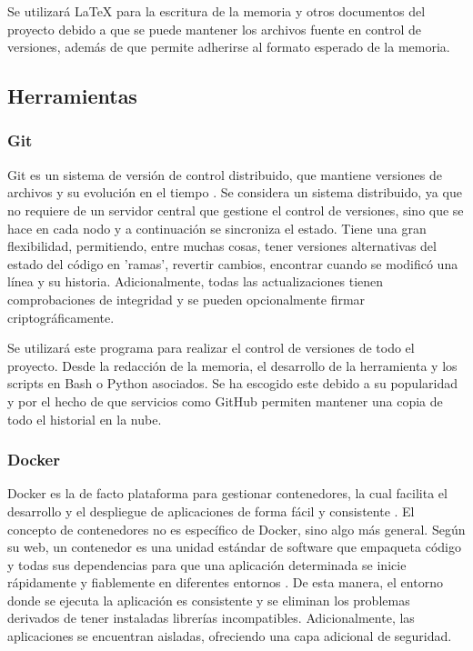Se utilizará LaTeX para la escritura de la memoria y otros documentos del proyecto debido a que se puede mantener los archivos fuente en control de versiones, además de que permite adherirse al formato esperado de la memoria.

\subsection{Herramientas}

\subsubsection{Git}

Git es un sistema de versión de control distribuido, que mantiene versiones de archivos y su evolución en el tiempo \cite{chacon2014pro}. Se considera un sistema distribuido, ya que no requiere de un servidor central que gestione el control de versiones, sino que se hace en cada nodo y a continuación se sincroniza el estado. Tiene una gran flexibilidad, permitiendo, entre muchas cosas, tener versiones alternativas del estado del código en 'ramas', revertir cambios, encontrar cuando se modificó una línea y su historia. Adicionalmente, todas las actualizaciones tienen comprobaciones de integridad y se pueden opcionalmente firmar criptográficamente.

Se utilizará este programa para realizar el control de versiones de todo el proyecto. Desde la redacción de la memoria, el desarrollo de la herramienta y los scripts en Bash o Python asociados. Se ha escogido este debido a su popularidad y por el hecho de que servicios como GitHub permiten mantener una copia de todo el historial en la nube.

\subsubsection{Docker}

Docker es la de facto plataforma para gestionar contenedores, la cual facilita el desarrollo y el despliegue de aplicaciones de forma fácil y consistente \cite{dockerruntime}. El concepto de contenedores no es específico de Docker, sino algo más general. Según su web, un contenedor es una unidad estándar de software que empaqueta código y todas sus dependencias para que una aplicación determinada se inicie rápidamente y fiablemente en diferentes entornos \cite{dockerwhatsacontainer}. De esta manera, el entorno donde se ejecuta la aplicación es consistente y se eliminan los problemas derivados de tener instaladas librerías incompatibles. Adicionalmente, las aplicaciones se encuentran aisladas, ofreciendo una capa adicional de seguridad.

